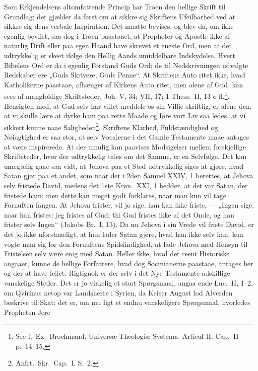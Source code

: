 \documentclass[12pt,a4paper]{article}
\newcommand{\opage}[1]{\marginnote{\footnotesize\textit{[#1]}}}
\begin{document}
Som Erkjendelsens altomfattende Princip har Troen den hellige
Skrift til Grundlag; det gjælder da først om at sikkre sig Skriftens
Ufeilbarhed ved at sikkre sig dens verbale Inspiration. Det maatte
bevises, og blev da, om ikke egenlig beviist, saa dog i Troen paastaaet,
at Propheter og Apostle ikke af naturlig Drift eller paa egen Haand
have skrevet et eneste Ord, men at det udtrykkelig er skeet ifølge
den Hellig Aands umiddelbare Indskydelse. Hvert Bibelens Ord
er da i egenlig Forstand Guds Ord; de til Nedskrivningen udvalgte
Redskaber ere „Guds Skrivere, Guds Penne“. At Skriftens Auto\-%
ritet ikke, hvad Katholikerne paastaae, afhænger af Kirkens Auto\-%
ritet, men alene af Gud, kan sees af mangfoldige Skriftsteder, Joh.
V, 34; VII, 17; 1 Thess.\ II, 13 o fl.\footnote{See f.\ Ex.\ Brochmand.
Universæ Theologiæ Systema. Articul II. Cap.\ II p.\ 14--15.}. %
Hensigten med, at Gud
selv har villet meddele os sin Villie skriftlig, er alene den, at vi
skulle lære at dyrke ham paa rette Maade og føre vort Liv saa\-%
ledes, at vi sikkert kunne naae Saligheden\footnote{Anfrt.\ Skr.\
Cap.\ I. S.\ 2.}. %
Skriftens Klarhed,
Fuldstændighed og Nøiagtighed er saa stor, at selv Vocalerne i
det Gamle Testamente maae antages at være inspirerede. At der
\opage{19}umulig kan paavises Modsigelser mellem forskjellige Skriftsteder,
hvor der udtrykkelig tales om det Samme, er en Selvfølge. Det
kan unægtelig gaae saa vidt, at Jehova paa et Sted udtrykkelig
siges at gjøre, hvad Satan gjør paa et andet, som naar det i 2den
Samuel XXIV, 1 berettes, at Jehova selv fristede David, medens
det 1ste Krøn.\ XXI, 1 hedder, at det var Satan, der fristede
ham; men dette kan meget godt forklares, naar man kun vil tage
Fornuften fangen. At Jehova frister, vil jo sige, han kan ikke
friste, --- „Ingen sige, naar han fristes: jeg fristes af Gud; thi
Gud fristes ikke af det Onde, og han frister selv Ingen“ (Jakobs
Br.\ I, 13). Da nu Jehova i sin Vrede vil friste David, er det jo
ikke uforstaaeligt, at han lader Satan gjøre, hvad han ikke selv
kan; kun vogte man sig for den Fornuftens Spidsfindighed, at lade
Jehova med Hensyn til Fristelsen selv være enig med Satan.
Heller ikke, hvad det reent Historiske angaaer, kunne de hellige
Forfattere, hvad dog Socinianerne paastaae, antages her og der at
have feilet. Rigtignok er der selv i det Nye Testamente adskillige
vanskelige Steder. Det er jo virkelig et stort Spørgsmaal, angaa\-%
ende Luc.\ II, 1--2, om Qvirinus netop var Landsherre i Syrien,
da Keiser August lod Alverden beskrive til Skat; det er, om mu\-%
ligt et endnu vanskeligere Spørgsmaal, hvorledes Propheten Jere\-%
\end{document}
